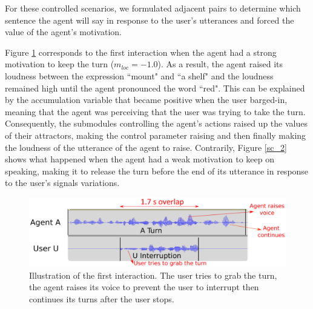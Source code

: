 For these controlled scenarios, we formulated adjacent pairs to determine which sentence the agent will say in response to the user's utterances and forced the value of the agent's motivation. 

Figure \ref{sc_1} corresponds to the first interaction when the agent had a strong motivation to keep the turn ($m_{loc}=-1.0$). 
As a result, the agent raised its loudness between the expression ``mount" and ``a shelf" and the loudness remained high until the agent pronounced the word ``red". This can be explained by the accumulation variable that became positive when the user barged-in, meaning that the agent was perceiving that the user was trying to take the turn. 
Consequently, the submodules controlling the agent's actions raised up the values of their attractors, making the control parameter raising and then finally making the loudness of the utterance of the agent to raise. 
Contrarily, Figure \ref{sc_2} shows what happened when the agent had a weak motivation to keep on speaking, making it to release the turn before the end of its utterance in response to the user's signals variations.

\begin{figure}
  \centering
  \includegraphics[width=\linewidth]{figure/volume_transcript_1_1_refait.eps}
  \caption{Illustration of the first interaction. The user tries to grab the turn, the agent raises its voice to prevent the user to interrupt then continues its turns after the user stops.}
  \label{sc_1}
\end{figure}

